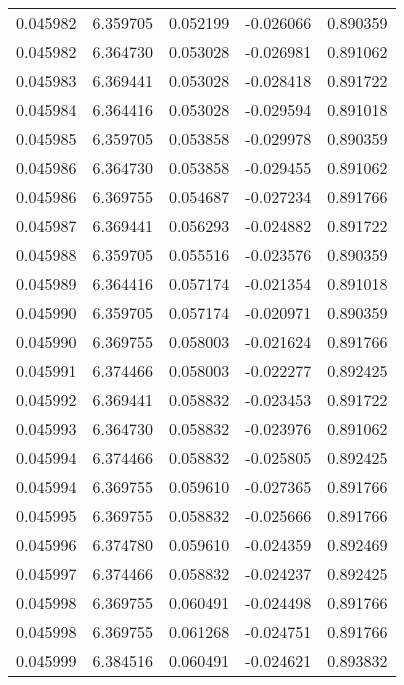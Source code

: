 \begin{tabular}{lrrrr}
0.045982    &  6.359705 &  0.052199 & -0.026066 &             0.890359 \\
0.045982    &  6.364730 &  0.053028 & -0.026981 &             0.891062 \\
0.045983    &  6.369441 &  0.053028 & -0.028418 &             0.891722 \\
0.045984    &  6.364416 &  0.053028 & -0.029594 &             0.891018 \\
0.045985    &  6.359705 &  0.053858 & -0.029978 &             0.890359 \\
0.045986    &  6.364730 &  0.053858 & -0.029455 &             0.891062 \\
0.045986    &  6.369755 &  0.054687 & -0.027234 &             0.891766 \\
0.045987    &  6.369441 &  0.056293 & -0.024882 &             0.891722 \\
0.045988    &  6.359705 &  0.055516 & -0.023576 &             0.890359 \\
0.045989    &  6.364416 &  0.057174 & -0.021354 &             0.891018 \\
0.045990    &  6.359705 &  0.057174 & -0.020971 &             0.890359 \\
0.045990    &  6.369755 &  0.058003 & -0.021624 &             0.891766 \\
0.045991    &  6.374466 &  0.058003 & -0.022277 &             0.892425 \\
0.045992    &  6.369441 &  0.058832 & -0.023453 &             0.891722 \\
0.045993    &  6.364730 &  0.058832 & -0.023976 &             0.891062 \\
0.045994    &  6.374466 &  0.058832 & -0.025805 &             0.892425 \\
0.045994    &  6.369755 &  0.059610 & -0.027365 &             0.891766 \\
0.045995    &  6.369755 &  0.058832 & -0.025666 &             0.891766 \\
0.045996    &  6.374780 &  0.059610 & -0.024359 &             0.892469 \\
0.045997    &  6.374466 &  0.058832 & -0.024237 &             0.892425 \\
0.045998    &  6.369755 &  0.060491 & -0.024498 &             0.891766 \\
0.045998    &  6.369755 &  0.061268 & -0.024751 &             0.891766 \\
0.045999    &  6.384516 &  0.060491 & -0.024621 &             0.893832 \\

\end{tabular}
